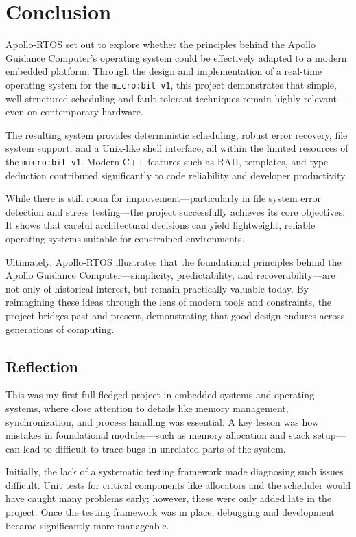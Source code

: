 \section{Conclusion}
\label{sec:conclusion}

Apollo-RTOS set out to explore whether the principles behind the Apollo Guidance
Computer's operating system could be effectively adapted to a modern embedded platform.
Through the design and implementation of a real-time operating system for the
\texttt{micro:bit v1}, this project demonstrates that simple, well-structured
scheduling and fault-tolerant techniques remain highly relevant—even on contemporary
hardware.

The resulting system provides deterministic scheduling, robust error recovery, file
system support, and a Unix-like shell interface, all within the limited resources of
the \texttt{micro:bit v1}. Modern C++ features such as RAII, templates, and type
deduction contributed significantly to code reliability and developer productivity.

While there is still room for improvement—particularly in file system error detection
and stress testing—the project successfully achieves its core objectives. It shows that
careful architectural decisions can yield lightweight, reliable operating systems
suitable for constrained environments.

Ultimately, Apollo-RTOS illustrates that the foundational principles behind the Apollo
Guidance Computer—simplicity, predictability, and recoverability—are not only of
historical interest, but remain practically valuable today. By reimagining these ideas
through the lens of modern tools and constraints, the project bridges past and present,
demonstrating that good design endures across generations of computing.


\subsection{Reflection}

This was my first full-fledged project in embedded systems and operating systems, where
close attention to details like memory management, synchronization, and process
handling was essential. A key lesson was how mistakes in foundational modules—such as
memory allocation and stack setup—can lead to difficult-to-trace bugs in unrelated
parts of the system.

Initially, the lack of a systematic testing framework made diagnosing such issues
difficult. Unit tests for critical components like allocators and the scheduler would
have caught many problems early; however, these were only added late in the project.
Once the testing framework was in place, debugging and development became significantly
more manageable.

